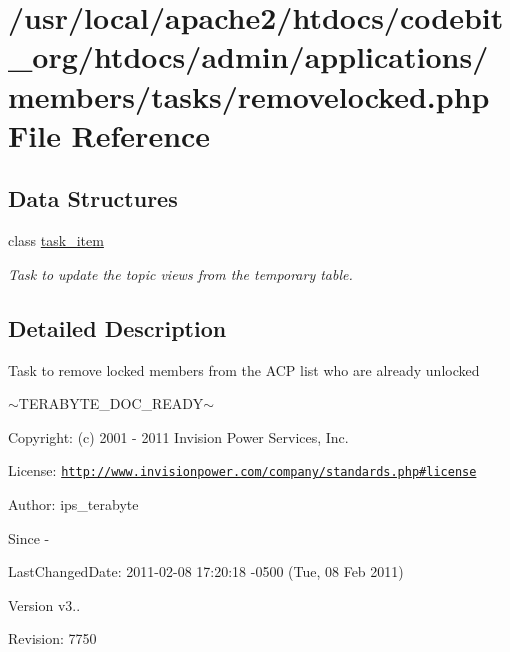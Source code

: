 \hypertarget{removelocked_8php}{\section{/usr/local/apache2/htdocs/codebit\-\_\-org/htdocs/admin/applications/members/tasks/removelocked.php File Reference}
\label{removelocked_8php}
}
\subsection*{Data Structures}
\begin{DoxyCompactItemize}
\item 
class \hyperlink{classtask__item}{task\-\_\-item}
\begin{DoxyCompactList}\small\item\em Task to update the topic views from the temporary table. \end{DoxyCompactList}\end{DoxyCompactItemize}


\subsection{Detailed Description}
\begin{DoxyVerb}  Task to remove locked members from the ACP list who are already unlocked
\end{DoxyVerb}
 $\sim$\-T\-E\-R\-A\-B\-Y\-T\-E\-\_\-\-D\-O\-C\-\_\-\-R\-E\-A\-D\-Y$\sim$ \begin{DoxyParagraph}{Copyright\-:}
(c) 2001 -\/ 2011 Invision Power Services, Inc.
\end{DoxyParagraph}
\begin{DoxyParagraph}{License\-:}
\href{http://www.invisionpower.com/company/standards.php#license}{\tt http\-://www.\-invisionpower.\-com/company/standards.\-php\#license}
\end{DoxyParagraph}
\begin{DoxyParagraph}{Author\-:}
ips\-\_\-terabyte 
\end{DoxyParagraph}
\begin{DoxySince}{Since}
-\/ 
\end{DoxySince}
\begin{DoxyParagraph}{Last\-Changed\-Date\-:}
2011-\/02-\/08 17\-:20\-:18 -\/0500 (Tue, 08 Feb 2011) 
\end{DoxyParagraph}
\begin{DoxyVersion}{Version}
v3.. 
\end{DoxyVersion}
\begin{DoxyParagraph}{Revision\-:}
7750 
\end{DoxyParagraph}
